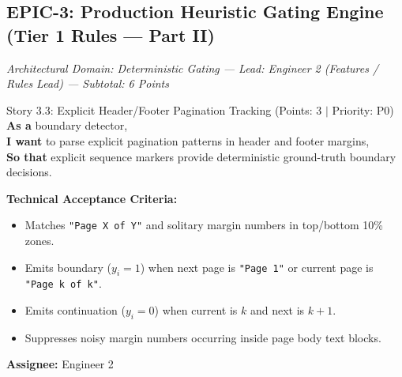 \documentclass[11pt,a4paper]{article}
\begin{document}
\subsection{EPIC-3: Production Heuristic Gating Engine (Tier 1 Rules --- Part II)}
\textit{Architectural Domain: Deterministic Gating --- Lead: Engineer 2 (Features / Rules Lead) --- Subtotal: 6 Points}

\vspace{0.5em}

\begin{storybox}{Story 3.3: Explicit Header/Footer Pagination Tracking (Points: 3 $|$ Priority: P0)}
\textbf{As a} boundary detector, \\
\textbf{I want} to parse explicit pagination patterns in header and footer margins, \\
\textbf{So that} explicit sequence markers provide deterministic ground-truth boundary decisions.

\vspace{0.3em}
\textbf{Technical Acceptance Criteria:}
\begin{itemize}[leftmargin=1.2em, itemsep=1pt]
    \item Matches \texttt{"Page X of Y"} and solitary margin numbers in top/bottom 10\% zones.
    \item Emits boundary ($y_i = 1$) when next page is \texttt{"Page 1"} or current page is \texttt{"Page k of k"}.
    \item Emits continuation ($y_i = 0$) when current is $k$ and next is $k+1$.
    \item Suppresses noisy margin numbers occurring inside page body text blocks.
\end{itemize}
\textbf{Assignee:} Engineer 2
\end{storybox}
\end{document}
